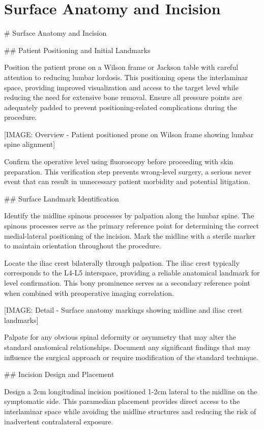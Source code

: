 \documentclass[12pt,a4paper]{article}
\begin{document}
\section{Surface Anatomy and Incision}




\# Surface Anatomy and Incision

\#\# Patient Positioning and Initial Landmarks

Position the patient prone on a Wilson frame or Jackson table with careful attention to reducing lumbar lordosis. This positioning opens the interlaminar space, providing improved visualization and access to the target level while reducing the need for extensive bone removal. Ensure all pressure points are adequately padded to prevent positioning-related complications during the procedure.

[IMAGE: Overview - Patient positioned prone on Wilson frame showing lumbar spine alignment]

Confirm the operative level using fluoroscopy before proceeding with skin preparation. This verification step prevents wrong-level surgery, a serious never event that can result in unnecessary patient morbidity and potential litigation.

\#\# Surface Landmark Identification

Identify the midline spinous processes by palpation along the lumbar spine. The spinous processes serve as the primary reference point for determining the correct medial-lateral positioning of the incision. Mark the midline with a sterile marker to maintain orientation throughout the procedure.

Locate the iliac crest bilaterally through palpation. The iliac crest typically corresponds to the L4-L5 interspace, providing a reliable anatomical landmark for level confirmation. This bony prominence serves as a secondary reference point when combined with preoperative imaging correlation.

[IMAGE: Detail - Surface anatomy markings showing midline and iliac crest landmarks]

Palpate for any obvious spinal deformity or asymmetry that may alter the standard anatomical relationships. Document any significant findings that may influence the surgical approach or require modification of the standard technique.

\#\# Incision Design and Placement

Design a 2cm longitudinal incision positioned 1-2cm lateral to the midline on the symptomatic side. This paramedian placement provides direct access to the interlaminar space while avoiding the midline structures and reducing the risk of inadvertent contralateral exposure.
\end{document}
